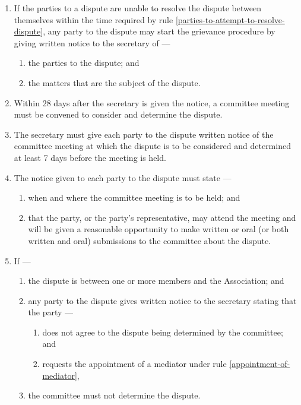 \documentclass[../constitution.tex]{subfiles}
\begin{document}
\begin{enumerate}

\item If the parties to a dispute are unable to resolve the dispute between themselves within the time required by rule \ref{parties-to-attempt-to-resolve-dispute}, any party to the dispute may start the grievance procedure by giving written notice to the secretary of ---

  \begin{enumerate}
  
  \item the parties to the dispute; and
  \item the matters that are the subject of the dispute.
  \end{enumerate}
\item Within 28 days after the secretary is given the notice, a committee meeting must be convened to consider and determine the dispute.
\item The secretary must give each party to the dispute written notice of the committee meeting at which the dispute is to be considered and determined at least 7 days before the meeting is held.
\item The notice given to each party to the dispute must state ---

  \begin{enumerate}
  
  \item when and where the committee meeting is to be held; and
  \item that the party, or the party's representative, may attend the meeting and will be given a reasonable opportunity to make written or oral (or both written and oral) submissions to the committee about the dispute.
  \end{enumerate}
\item If ---

  \begin{enumerate}
  
  \item the dispute is between one or more members and the Association; and
  \item any party to the dispute gives written notice to the secretary stating that the party ---

    \begin{enumerate}
    
    \item does not agree to the dispute being determined by the committee; and
    \item requests the appointment of a mediator under rule \ref{appointment-of-mediator},
    \end{enumerate}
  \item the committee must not determine the dispute.
  \end{enumerate}
\end{enumerate}
\end{document}
